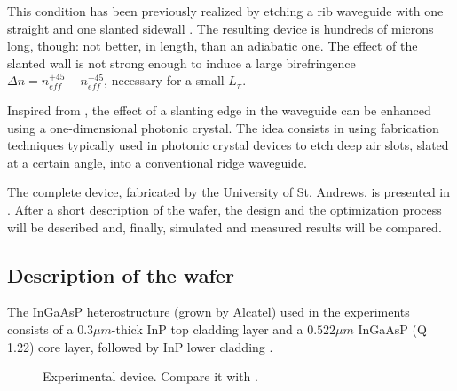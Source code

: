 This condition has been previously realized by etching a rib waveguide
with one straight and one slanted sidewall \cite{elrefaei_slanted}
\cite{elrefaei_optimized}. The resulting device is hundreds of microns
long, though: not better, in length, than an adiabatic one. The effect
of the slanted wall is not strong enough to induce a large
birefringence $\Delta n = n_{eff}^{+45} - n_{eff}^{-45}$, necessary
for a small $L_\pi$.

Inspired from \cite{cai_ultra}, the effect of a slanting edge
in the waveguide can be enhanced using a one-dimensional photonic
crystal. The idea consists in using fabrication techniques typically
used in photonic crystal devices to etch deep air slots, slated at a
certain angle, into a conventional ridge waveguide.

The complete device, fabricated by the University of St. Andrews, is
presented in \cite{kotlyar_compact}. After a short description of the
wafer, the design and the optimization process will be described and,
finally, simulated and measured results will be compared.

\subsection{Description of the wafer}

The InGaAsP heterostructure (grown by Alcatel) used in the experiments
consists of a $0.3 \mu m$-thick InP top cladding layer and a $0.522
\mu m$ InGaAsP (Q 1.22) core layer, followed by InP lower cladding
.

\begin{figure}[htbp]
  \begin{center}
  \end{center}
  \caption{Experimental device. Compare it with
  .}
  \label{fig:polrot_experimental_device}
\end{figure}

